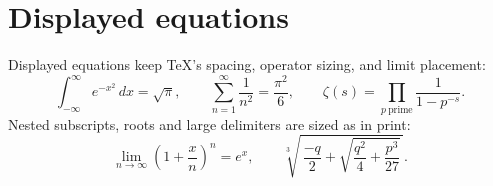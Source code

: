 \section*{Displayed equations}
Displayed equations keep \TeX{}'s spacing, operator sizing, and limit placement:
\[
  \int_{-\infty}^{\infty} e^{-x^2}\,dx = \sqrt{\pi},
  \qquad
  \sum_{n=1}^{\infty} \frac{1}{n^2} = \frac{\pi^2}{6},
  \qquad
  \zeta(s) = \prod_{p\ \mathrm{prime}} \frac{1}{1 - p^{-s}}.
\]
Nested subscripts, roots and large delimiters are sized as in print:
\[
  \lim_{n \to \infty} \left( 1 + \frac{x}{n} \right)^{\! n} = e^{x},
  \qquad
  \sqrt[3]{\,\frac{-q}{2} + \sqrt{\frac{q^2}{4} + \frac{p^3}{27}}\,}.
\]
